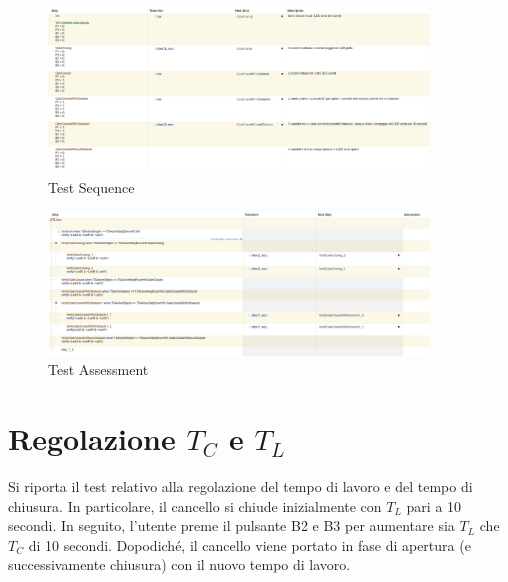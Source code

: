         \begin{figure}[H]
            \centering
            \includegraphics[width=0.9\textwidth]{figures/closedobs.png}
            \caption{Test Sequence}
            \label{closeobs}
        \end{figure}
        
        \begin{figure}[H]
            \centering
            \includegraphics[width=0.9\textwidth]{figures/closedobs1.png}
            \caption{Test Assessment}
            \label{closeobs1}
        \end{figure}

    
    \section{Regolazione $T_C$ e $T_L$}
        Si riporta il test relativo alla regolazione del tempo di lavoro e del tempo di chiusura.
        In particolare, il cancello si chiude inizialmente con $T_L$ pari a 10 secondi.
        In seguito, l'utente preme il pulsante B2 e B3 per aumentare sia $T_L$ che $T_C$ di 10 secondi.
        Dopodiché, il cancello viene portato in fase di apertura (e successivamente chiusura) con il nuovo tempo di lavoro.

